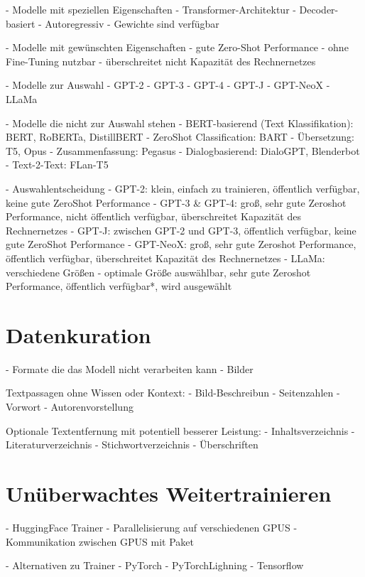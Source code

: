 - Modelle mit speziellen Eigenschaften
    - Transformer-Architektur
    - Decoder-basiert
    - Autoregressiv
    - Gewichte sind verfügbar

- Modelle mit gewünschten Eigenschaften
    - gute Zero-Shot Performance
    - ohne Fine-Tuning nutzbar
    - überschreitet nicht Kapazität des Rechnernetzes

- Modelle zur Auswahl
    - GPT-2
    - GPT-3
    - GPT-4
    - GPT-J
    - GPT-NeoX
    - LLaMa

- Modelle die nicht zur Auswahl stehen
    - BERT-basierend (Text Klassifikation): BERT, RoBERTa, DistillBERT
    - ZeroShot Classification: BART
    - Übersetzung: T5, Opus
    - Zusammenfassung: Pegasus
    - Dialogbasierend: DialoGPT, Blenderbot
    - Text-2-Text: FLan-T5


- Auswahlentscheidung
    - GPT-2: klein, einfach zu trainieren, öffentlich verfügbar, keine gute ZeroShot Performance
    - GPT-3 \& GPT-4: groß, sehr gute Zeroshot Performance, nicht öffentlich verfügbar, überschreitet Kapazität des Rechnernetzes
    - GPT-J: zwischen GPT-2 und GPT-3, öffentlich verfügbar, keine gute ZeroShot Performance
    - GPT-NeoX: groß, sehr gute Zeroshot Performance, öffentlich verfügbar, überschreitet Kapazität des Rechnernetzes
    - LLaMa: verschiedene Größen - optimale Größe auswählbar, sehr gute Zeroshot Performance, öffentlich verfügbar*, wird ausgewählt

\section{Datenkuration}

- Formate die das Modell nicht verarbeiten kann
    - Bilder

Textpassagen ohne Wissen oder Kontext:
    - Bild-Beschreibun
    - Seitenzahlen
    - Vorwort
    - Autorenvorstellung

Optionale Textentfernung mit potentiell besserer Leistung:
    - Inhaltsverzeichnis
    - Literaturverzeichnis
    - Stichwortverzeichnis
    - Überschriften

\section{Unüberwachtes Weitertrainieren}
- HuggingFace Trainer
- Parallelisierung auf verschiedenen GPUS
- Kommunikation zwischen GPUS mit Paket

- Alternativen zu Trainer
    - PyTorch
    - PyTorchLighning
    - Tensorflow

